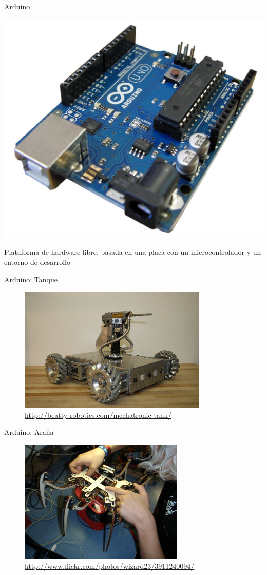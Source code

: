 \documentclass[14pt]{beamer}
\begin{document}
\begin{frame}{Arduino}
  \begin{center}
  \includegraphics[width=.45\textwidth]{pics/arduino.jpg}
  \end{center}
  \vspace{-0.5cm}
  \begin{block}{}\centering
    Plataforma de hardware libre, basada en una placa con un
    microcontrolador y un entorno de desarrollo
  \end{block}
\end{frame}

\begin{frame}{Arduino: Tanque}
  \begin{figure}
    \centering
    \includegraphics[width=0.8\textwidth]{pics/arduino-tank.jpg}
    \caption*{\small \url{http://beatty-robotics.com/mechatronic-tank/}}
  \end{figure}
\end{frame}

\begin{frame}{Arduino: Araña}
  \begin{figure}
    \centering
    \includegraphics[width=0.7\textwidth]{pics/arduino-spider.jpg}
    \caption*{\small \url{http://www.flickr.com/photos/wizard23/3911240094/}}
  \end{figure}
\end{frame}
\end{document}
